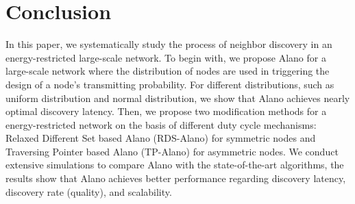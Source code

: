 \section{Conclusion}
\label{Conclusion}
In this paper, we systematically study the process of neighbor discovery in an energy-restricted large-scale network.
To begin with, we propose Alano for a large-scale network where the distribution of nodes are used in triggering the design of a node's transmitting probability. For different distributions, such as uniform distribution and normal distribution, we show that Alano achieves nearly optimal discovery latency. Then, we propose two modification methods for a energy-restricted network on the basis of different duty cycle mechanisms: Relaxed Different Set based Alano (RDS-Alano) for symmetric nodes and Traversing Pointer based Alano (TP-Alano) for asymmetric nodes. We conduct extensive simulations to compare Alano with the state-of-the-art algorithms, the results show that Alano achieves better performance regarding discovery latency, discovery rate (quality), and scalability.%
